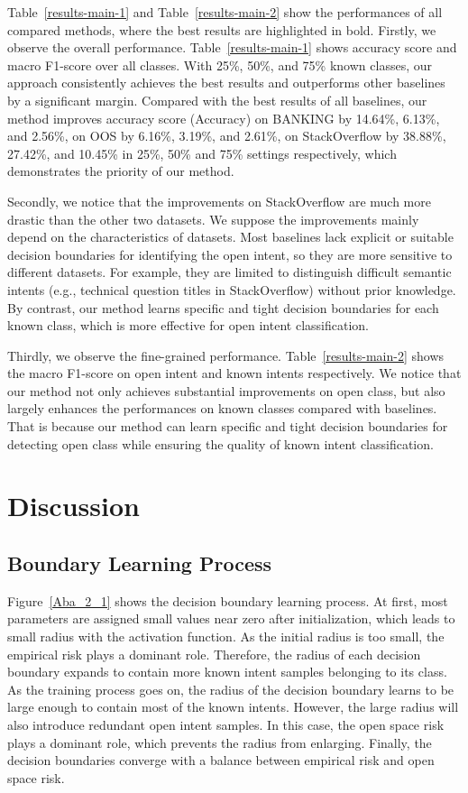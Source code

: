 \documentclass[letterpaper]{article} \usepackage{aaai21}  \usepackage{times}  \usepackage{helvet} \usepackage{courier}  \usepackage[hyphens]{url}  \usepackage{graphicx} \urlstyle{rm} \def\UrlFont{\rm}  \usepackage{natbib}  \usepackage{caption} \frenchspacing  \setlength{\pdfpagewidth}{8.5in}  \setlength{\pdfpageheight}{11in}  \usepackage{amsmath}
\begin{document}
	Table~\ref{results-main-1} and Table~\ref{results-main-2} show the performances of all compared methods, where the best results are highlighted in bold. Firstly, we observe the overall performance. Table~\ref{results-main-1} shows  accuracy score and macro F1-score over all classes. With 25\%, 50\%, and 75\% known classes, our approach consistently achieves the best results and outperforms other baselines by a significant margin. Compared with the best results of all baselines, our method improves accuracy score (Accuracy) on BANKING by 14.64\%, 6.13\%, and 2.56\%, on OOS by 6.16\%, 3.19\%, and 2.61\%, on StackOverflow by 38.88\%, 27.42\%, and 10.45\% in 25\%, 50\% and 75\% settings respectively, which demonstrates the priority of our method. 
	
	Secondly, we notice that the improvements on StackOverflow are much more drastic than the other two datasets. We suppose the improvements mainly depend on the characteristics of datasets. Most baselines lack explicit or suitable decision boundaries for identifying the open intent, so they are more sensitive to different datasets. For example, they are limited to distinguish difficult semantic intents (e.g., technical question titles in StackOverflow) without prior knowledge. By contrast, our method learns specific and tight decision boundaries for each known class, which is more effective for open intent classification. 
	
	Thirdly, we observe the fine-grained performance. Table~\ref{results-main-2} shows the macro F1-score on open intent and known intents respectively. We notice that our method not only achieves substantial improvements on open class, but also largely enhances the performances on known classes compared with baselines. That is because our method can learn specific and tight decision boundaries for detecting open class while ensuring the quality of known intent classification. 
	
	\section{Discussion}
	
	\subsection{Boundary Learning Process}
	Figure~\ref{Aba_2_1} shows the decision boundary learning process. At first, most parameters are assigned small values near zero after initialization, which leads to small radius with the  activation function. As the initial radius is too small, the empirical risk plays a dominant role. Therefore, the radius of each decision boundary expands to contain more known intent samples belonging to its class. As the training process goes on, the radius of the decision boundary learns to be large enough to contain most of the known intents. However, the large radius will also introduce redundant open intent samples. In this case, the open space risk plays a dominant role, which prevents the radius from enlarging. Finally, the decision boundaries converge with a balance between empirical risk and open space risk.
	
\end{document}
